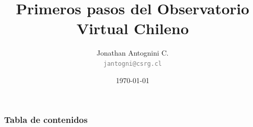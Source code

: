 \documentclass[10pt]{beamer}
\title[Primeros Pasos Chivo]{Primeros pasos del Observatorio Virtual Chileno}
\author{Jonathan Antognini C. \\
        \small{\textcolor{gray}{\texttt{jantogni@csrg.cl}}}}
\institute[CSRG-UTFSM]{
Computer Systems Research Group,\\
Universidad Técnica Fedrico Santa María
}
\date{\today}
\begin{document}
\begin{frame}[t,plain]
\titlepage
\end{frame}


\begin{frame}
	\frametitle{Tabla de contenidos}
	\tableofcontents
\end{frame}


\newpage


\newpage


\newpage


\newpage


\newpage


\newpage



%
%


\begin{frame}[t,plain]
\titlepage
\end{frame}
\end{document}
